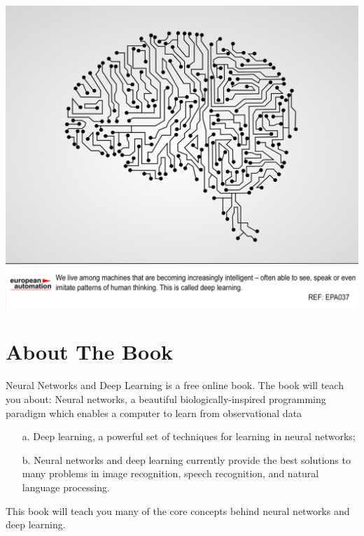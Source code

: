 \documentclass[a4paper,12pt]{report}%
\begin{document}
\newpage
\includegraphics[width=1.0\textwidth]{./images/deep-learning-eu.jpg}

\newpage
{\color{gray}
\section*{\Large About The Book}
Neural Networks and Deep Learning is a free online book. The book will teach you about:
Neural networks, a beautiful biologically-inspired programming paradigm which enables a computer to learn from observational data
\begin{itemize}
\item[a.] Deep learning, a powerful set of techniques for learning in neural networks;
\item[b.] Neural networks and deep learning currently provide the best solutions to many problems in image recognition, speech recognition, and natural language processing.
\end{itemize}
This book will teach you many of the core concepts behind neural networks and deep learning.
} %



\bigskip

\vspace{1cm}
\end{document}

